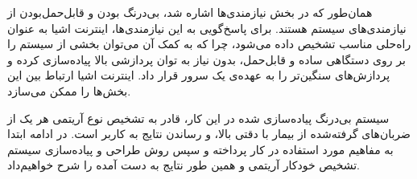 همان‌طور که در بخش نیازمندی‌ها اشاره شد، بی‌درنگ بودن و قابل‌حمل‌بودن از نیازمندی‌های سیستم هستند. برای پاسخ‌گویی به این نیازمندی‌ها، اینترنت اشیا به عنوان راه‌حلی مناسب تشخیص‌ داده می‌شود، چرا که به کمک آن می‌توان بخشی از سیستم را بر روی دستگاهی ساده و قابل‌حمل، بدون نیاز به توان پردازشی بالا پیاده‌سازی کرده و پردازش‌های سنگین‌تر را به عهده‌ی یک سرور قرار داد. اینترنت اشیا ارتباط بین این بخش‌ها را ممکن می‌سازد.

سیستم بی‌درنگ پیاده‌سازی شده در این کار،  قادر به تشخیص نوع آریتمی هر یک از ضربان‌های گرفته‌شده از بیمار با دقتی بالا، و رساندن نتایج به کاربر است. در ادامه ابتدا به مفاهیم مورد استفاده در کار پرداخته و سپس روش طراحی و پیاده‌سازی سیستم تشخیص خودکار آریتمی و همین طور نتایج به دست آمده را شرح خواهیم‌داد. 

